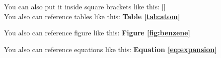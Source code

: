 You can also put it inside square brackets like this: \hspace{1cm}
[\cite{hohenberg1964inhomogeneous}]   \\

You also can reference tables like this: \hspace{1cm} 
\textbf{Table \ref{tab:atom}}


You also can reference figure like this: \hspace{1cm} 
\textbf{Figure \ref{fig:benzene}}


You also can reference equations like this: \hspace{1cm} 
\textbf{Equation \ref{eq:expansion}}




















